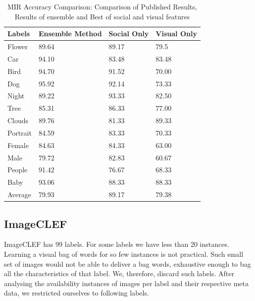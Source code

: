 \begin{table}
\centering
\caption{ MIR Accuracy Comparison: Comparison of Published Results, Results of ensemble and Best of social and visual features} %
\vspace*{0.2 cm}
\begin{tabular}{| p{2cm}| p{1.5cm}|p{1.2cm}|p{1.2cm}|} \hline
Labels & Ensemble Method & Social Only & Visual Only  \\  [1ex] \hline
Flower & 89.64 & 89.17 & 79.5 \\  [1ex] \hline
Car & 94.10 & 83.48 & 83.48 \\  [1ex] \hline
Bird & 94.70 & 91.52 & 70.00 \\  [1ex] \hline
Dog & 95.92 & 92.14 & 73.33 \\  [1ex] \hline
Night & 89.22 & 93.33 & 82.50 \\  [1ex] \hline
Tree & 85.31 & 86.33 & 77.00 \\  [1ex] \hline
Clouds & 89.76 & 81.33 & 89.33 \\  [1ex] \hline
Portrait & 84.59 & 83.33 & 70.33 \\  [1ex] \hline
Female & 84.63 & 84.33 & 63.00 \\  [1ex] \hline
Male & 79.72 & 82.83 & 60.67 \\  [1ex] \hline
People & 91.42 & 76.67 & 68.33 \\  [1ex] \hline
Baby & 93.06 & 88.33 & 88.33 \\  [1ex] \hline
Average & 79.93 & 89.17 & 79.38 \\  [1ex] \hline
\end{tabular}
 \label{MIRAccuracyOverAll} %
\end{table}



\subsection{ImageCLEF}
ImageCLEF has 99 labels. For some labels we have less than 20  instances. Learning a visual bag of words for so few instances is not practical. Such small set of images would not be able to deliver a bag words, exhaustive enough to bag all the characteristics of that label. We, therefore, discard such labels. After analysing the availability instances of images per label and their respective meta data, we restricted ourselves to following labels. 

